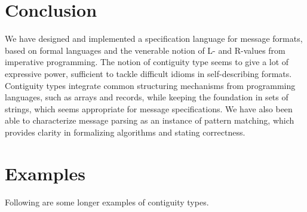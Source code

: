 \documentclass[sigplan,10pt,anonymous,review]{acmart}\settopmatter{printfolios=true,printccs=false,printacmref=false}
\begin{document}
\section{Conclusion}

We have designed and implemented a specification language for message
formats, based on formal languages and the venerable notion of L- and
R-values from imperative programming. The notion of contiguity type
seems to give a lot of expressive power, sufficient to tackle
difficult idioms in self-describing formats. Contiguity types
integrate common structuring mechanisms from programming languages,
such as arrays and records, while keeping the foundation in sets of
strings, which seems appropriate for message specifications. We have
also been able to characterize message parsing as an instance of
pattern matching, which provides clarity in formalizing algorithms and
stating correctness.

\appendix

\section{Examples}

Following are some longer examples of contiguity types.
\end{document}
